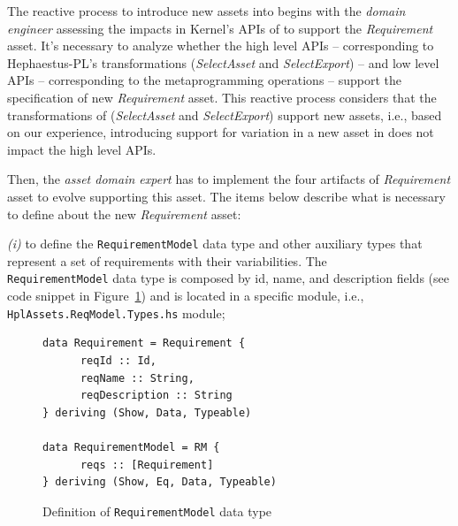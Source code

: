 The reactive process to introduce new assets into \hpl{} begins with the \textit{domain engineer} assessing the impacts in Kernel's APIs of \hpl{} to support the \textit{Requirement} asset. It's necessary to analyze whether the high level APIs \--- corresponding to Hephaestus-PL's transformations (\textit{SelectAsset} and \textit{SelectExport}) \--- and low level APIs \--- corresponding to the metaprogramming operations \--- support the specification of new \textit{Requirement} asset. This reactive process considers that the transformations of \hpl{} (\textit{SelectAsset} and \textit{SelectExport}) support new assets, i.e., 
based on our experience, introducing support for variation in a new asset in \hpl{} does not impact the high level APIs. 

Then, the \textit{asset domain expert} has to implement the four artifacts of \textit{Requirement} asset to evolve \hpl{} supporting this asset. The items below describe what is necessary to define about the new \textit{Requirement} asset:

\textit{(i)} to define the \texttt{RequirementModel} data type and other auxiliary types that represent a set of requirements with their variabilities. The \\ \texttt{RequirementModel} data type is composed by id, name, and description fields (see code snippet in Figure~\ref{fig:code-req-data-type}) and is located in a specific module, i.e., \texttt{ HplAssets.ReqModel.Types.hs} module; 

\begin{figure}
\begin{lstlisting}
data Requirement = Requirement {
      reqId :: Id, 
      reqName :: String,
      reqDescription :: String
} deriving (Show, Data, Typeable)        
             
data RequirementModel = RM {
      reqs :: [Requirement]
} deriving (Show, Eq, Data, Typeable)
\end{lstlisting}  
\caption{Definition of \texttt{RequirementModel} data type}
\label{fig:code-req-data-type}
\end{figure}   


